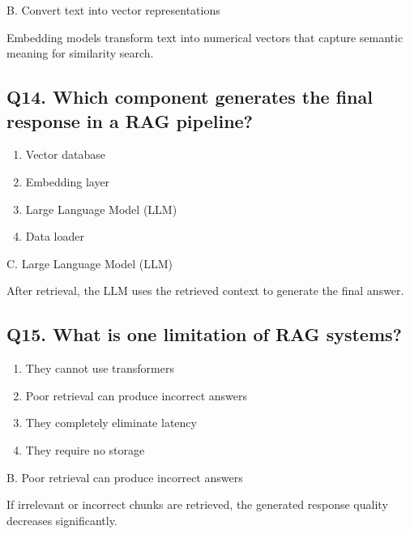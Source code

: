 \documentclass[12pt,a4paper]{article}
\begin{document}
\begin{tcolorbox}[colback=mid,colframe=softblue,title=Correct Answer]
B. Convert text into vector representations

Embedding models transform text into numerical vectors that capture semantic meaning for similarity search.
\end{tcolorbox}


\subsection*{Q14. Which component generates the final response in a RAG pipeline?}

\begin{enumerate}[label=\Alph*.]
\item Vector database
\item Embedding layer
\item Large Language Model (LLM)
\item Data loader
\end{enumerate}

\begin{tcolorbox}[colback=mid,colframe=softblue,title=Correct Answer]
C. Large Language Model (LLM)

After retrieval, the LLM uses the retrieved context to generate the final answer.
\end{tcolorbox}


\subsection*{Q15. What is one limitation of RAG systems?}

\begin{enumerate}[label=\Alph*.]
\item They cannot use transformers
\item Poor retrieval can produce incorrect answers
\item They completely eliminate latency
\item They require no storage
\end{enumerate}

\begin{tcolorbox}[colback=mid,colframe=softblue,title=Correct Answer]
B. Poor retrieval can produce incorrect answers

If irrelevant or incorrect chunks are retrieved, the generated response quality decreases significantly.
\end{tcolorbox}
\end{document}
